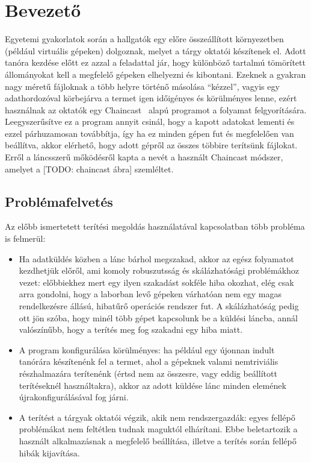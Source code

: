 \chapter{Bevezető} 

Egyetemi gyakorlatok során a hallgatók egy előre összeállított környezetben (például virtuális
gépeken) dolgoznak, melyet a tárgy oktatói készítenek el. Adott tanóra kezdése előtt 
ez azzal a feladattal jár, hogy különböző tartalmú tömörített állományokat kell a megfelelő gépeken elhelyezni és kibontani. Ezeknek a gyakran nagy méretű fájloknak a több helyre történő másolása ``kézzel'', vagyis egy adathordozóval körbejárva a termet igen időigényes és körülményes lenne, ezért használnak az oktatók egy Chaincast~\cite{kiraly2011chaincast} alapú programot a folyamat felgyorítására. Leegyszerűsítve ez a program annyit csinál, hogy a kapott adatokat lementi és ezzel párhuzamosan továbbítja, így ha ez minden gépen fut és megfelelően van beállítva, akkor elérhető, hogy adott gépről az összes többire terítsünk fájlokat. Erről a láncsszerű mőködésről kapta a nevét a használt Chaincast módszer, amelyet a [TODO: chaincast ábra] szemléltet.

\section{Problémafelvetés}

Az előbb ismertetett terítési megoldás használatával kapcsolatban több probléma is felmerül:

\begin{itemize}
  \item Ha adatküldés közben a lánc bárhol megszakad, akkor az egész folyamatot kezdhetjük előről, ami komoly robuszutsság és skálázhatósági problémákhoz vezet: előbbiekhez mert egy ilyen szakadást sokféle hiba okozhat, elég csak arra gondolni, hogy a laborban levő gépeken várhatóan nem egy magas rendelkezésre állású, hibatűrő operációs rendszer fut. A skálázhatóság pedig ott jön szóba, hogy minél több gépet kapcsolunk be a küldési láncba, annál valószínűbb, hogy a terítés meg fog szakadni egy hiba miatt.
   \item A program konfigurálása körülményes: ha például egy újonnan indult tanórára készítenénk fel a termet, ahol a gépeknek valami nemtriviális részhalmazára terítenénk (értsd nem az összesre, vagy eddig beállított terítéseknél használtakra), akkor az adott küldése lánc minden elemének újrakonfigurálásával fog járni.
   \item A terítést a tárgyak oktatói végzik, akik nem rendszergazdák: egyes fellépő problémákat nem feltétlen tudnak maguktól elhárítani. Ebbe beletartozik a használt alkalmazásnak a megfelelő beállítása, illetve a terítés során fellépő hibák kijavítása.
\end{itemize}

